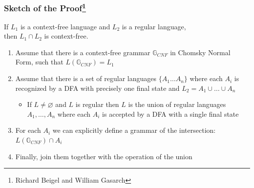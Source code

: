 \documentclass[xcolor=table]{beamer}
\begin{document}
\begin{frame} \frametitle{Sketch of the Proof\footnote{Richard Beigel and William Gasarch}}

\begin{theorem}
	If $L_1$ is a context-free language and $L_2$ is a regular language, \\ then $L_1 \cap L_2$ is context-free.
\end{theorem}


\begin{enumerate}
  \item Assume that there is a context-free grammar $\mathbb{G}_{CNF}$ in Chomsky Normal Form, such that $L(\mathbb{G}_{CNF}) = L_1$
  \pause
  \item Assume that there is a set of regular languages $\{A_1 \ldots A_n\}$ where each $A_i$ is recognized by a DFA with precisely one final state and $L_2 = A_1 \cup \ldots \cup A_n$
  \pause
  \begin{itemize}
    \item If $ L \neq \varnothing $ and $L$ is regular then $L$ is the union of regular languages $A_1, \ldots , A_n$ where each $A_i$ is accepted by a DFA with a single final state
  \end{itemize}
  \pause
  \item For each $A_i$ we can explicitly define a grammar of the intersection: $L(\mathbb{G}_{CNF}) \cap A_i$
  \pause
  \item Finally, join them together with the operation of the union
\end{enumerate}

\end{frame}
\end{document}
